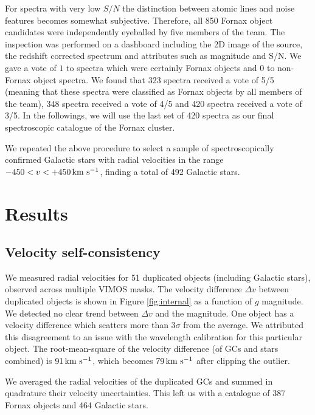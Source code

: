 For spectra with very low $S/N$ the distinction between atomic lines and noise 
features becomes somewhat subjective. Therefore, all 850 Fornax object 
candidates were independently eyeballed by five members of the team. The 
inspection was performed on a dashboard including the 2D image of the source, 
the redshift corrected spectrum and attributes such as magnitude and S/N. We 
gave a vote of $1$ to spectra which were certainly Fornax objects and $0$ to 
non-Fornax object spectra. We found that 323 spectra received a vote of 5/5 
(meaning that these spectra were classified as Fornax objects by all members of 
the team), 348 spectra received a vote of 4/5 and 420 spectra received a vote 
of 3/5. In the followings, we will use the last set of 420 spectra as our final 
spectroscopic catalogue of the Fornax cluster. 

We repeated the above procedure to select a sample of spectroscopically 
confirmed Galactic stars with radial velocities in the range $-450<v<+450 
\mbox{\,km~s$^{-1}$}$, finding a total of 492 Galactic stars.

\section{Results}
\label{sec:analysis}
\subsection{Velocity self-consistency}

We measured radial velocities for 51 duplicated objects (including Galactic 
stars), observed across multiple VIMOS masks. The velocity difference $\Delta 
v$ between duplicated objects is shown in Figure \ref{fig:internal} as a 
function of $g$ magnitude. We detected no clear trend between $\Delta v$ and 
the magnitude. One object has a velocity difference which scatters more than 
3$\sigma$ from the average. We attributed this disagreement to an issue with 
the wavelength calibration for this particular object. The root-mean-square of 
the velocity difference (of GCs and stars combined) is $91 \mbox{\,km~s$^{-1}$}$, which becomes 
$79\mbox{\,km~s$^{-1}$}$ after clipping the outlier. 

We averaged the radial velocities of the duplicated GCs and summed in 
quadrature their velocity uncertainties. This left us with a catalogue of 387 
Fornax objects and 464 Galactic stars.


